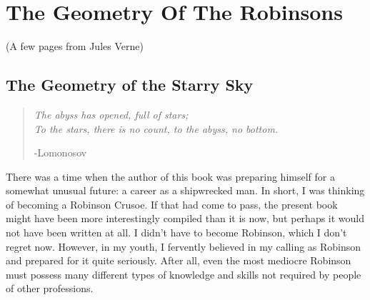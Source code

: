 

\chapter{The Geometry Of The Robinsons}
\label{ch-07}

\begin{center}
{\large (A few pages from Jules Verne)}
\end{center}

	
\section{The Geometry of the Starry Sky}
\label{sec-7.1}
\begin{quote}
\emph{The abyss has opened, full of stars;\\
To the stars, there is no count, to the abyss, no bottom.}\\
\begin{flushright}
-Lomonosov
\end{flushright}
\end{quote}

There was a time when the author of this book was preparing himself for a somewhat unusual future: a career as a shipwrecked man. In short, I was thinking of becoming a Robinson Crusoe. If that had come to pass, the present book might have been more interestingly compiled than it is now, but perhaps it would not have been written at all. I didn't have to become Robinson, which I don't regret now. However, in my youth, I fervently believed in my calling as Robinson and prepared for it quite seriously. After all, even the most mediocre Robinson must possess many different types of knowledge and skills not required by people of other professions.

